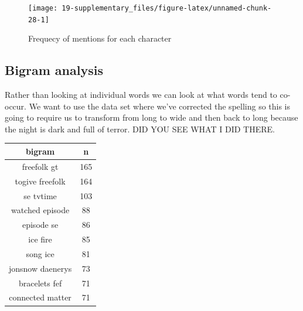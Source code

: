 \documentclass[]{book}
\newenvironment{Shaded}{\begin{snugshade}}{\end{snugshade}}
\newcommand{\CommentTok}[1]{\textcolor[rgb]{0.56,0.35,0.01}{\textit{#1}}}
\newcommand{\DataTypeTok}[1]{\textcolor[rgb]{0.13,0.29,0.53}{#1}}
\newcommand{\DecValTok}[1]{\textcolor[rgb]{0.00,0.00,0.81}{#1}}
\newcommand{\KeywordTok}[1]{\textcolor[rgb]{0.13,0.29,0.53}{\textbf{#1}}}
\newcommand{\NormalTok}[1]{#1}
\newcommand{\OperatorTok}[1]{\textcolor[rgb]{0.81,0.36,0.00}{\textbf{#1}}}
\newcommand{\OtherTok}[1]{\textcolor[rgb]{0.56,0.35,0.01}{#1}}
\newcommand{\StringTok}[1]{\textcolor[rgb]{0.31,0.60,0.02}{#1}}
\begin{document}
\begin{figure}

{\centering \texttt{[image: 19-supplementary\_files/figure-latex/unnamed-chunk-28-1]} 

}

\caption{Frequecy of mentions for each character}\label{fig:unnamed-chunk-28}
\end{figure}

\hypertarget{bigram-analysis}{%
\subsection{Bigram analysis}\label{bigram-analysis}}

Rather than looking at individual words we can look at what words tend to co-occur. We want to use the data set where we've corrected the spelling so this is going to require us to transform from long to wide and then back to long because the night is dark and full of terror. DID YOU SEE WHAT I DID THERE.

\begin{Shaded}
\end{Shaded}

\begin{tabular}{c|c}
\hline
bigram & n\\
\hline
freefolk gt & 165\\
\hline
togive freefolk & 164\\
\hline
se tvtime & 103\\
\hline
watched episode & 88\\
\hline
episode se & 86\\
\hline
ice fire & 85\\
\hline
song ice & 81\\
\hline
jonsnow daenerys & 73\\
\hline
bracelets fef & 71\\
\hline
connected matter & 71\\
\hline
\end{tabular}
\end{document}
